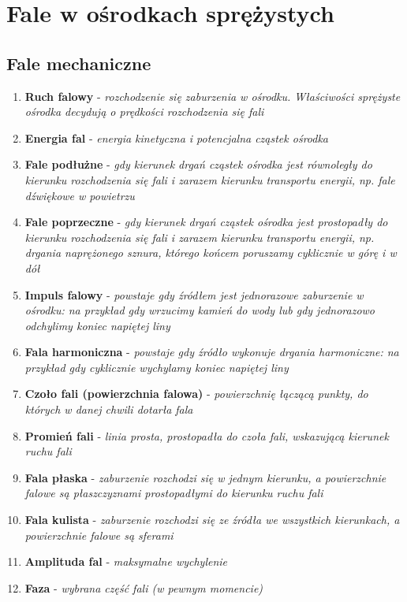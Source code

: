 \documentclass[12pt,twoside,a4paper]{book}
\begin{document}
\chapter{Fale w ośrodkach sprężystych}
\section{Fale mechaniczne}
\begin{enumerate}[label=(\alph*)]
\item\textbf{Ruch falowy} - \textit{rozchodzenie się zaburzenia w ośrodku. Właściwości sprężyste ośrodka decydują o prędkości rozchodzenia się fali}
\item\textbf{Energia fal} - \textit{energia kinetyczna i potencjalna cząstek ośrodka}
\item\textbf{Fale podłużne} - \textit{gdy kierunek drgań cząstek ośrodka jest równoległy do kierunku
rozchodzenia się fali i zarazem kierunku transportu energii, np. fale dźwiękowe w powietrzu}
\item\textbf{Fale poprzeczne} - \textit{gdy kierunek drgań cząstek ośrodka jest prostopadły do kierunku
rozchodzenia się fali i zarazem kierunku transportu energii, np. drgania naprężonego sznura, którego końcem poruszamy cyklicznie w górę i w dół}
\item\textbf{Impuls falowy} - \textit{powstaje gdy źródłem jest jednorazowe zaburzenie w ośrodku: na przykład
gdy wrzucimy kamień do wody lub gdy jednorazowo odchylimy koniec napiętej liny}
\item\textbf{Fala harmoniczna} - \textit{powstaje gdy źródło wykonuje drgania harmoniczne: na przykład gdy
cyklicznie wychylamy koniec napiętej liny}
\item\textbf{Czoło fali (powierzchnia falowa)} - \textit{powierzchnię łączącą punkty, do których w danej chwili dotarła fala}
\item\textbf{Promień fali} - \textit{linia prosta, prostopadła do czoła fali, wskazującą kierunek ruchu fali}
\item\textbf{Fala płaska} - \textit{zaburzenie rozchodzi się w jednym kierunku, a powierzchnie
falowe są płaszczyznami prostopadłymi do kierunku ruchu fali}
\item\textbf{Fala kulista} - \textit{zaburzenie rozchodzi się ze źródła we wszystkich kierunkach,
a powierzchnie falowe są sferami}
\item\textbf{Amplituda fal} - \textit{maksymalne wychylenie}
\item\textbf{Faza} - \textit{wybrana część fali (w pewnym momencie)}

\end{enumerate}
\end{document}

